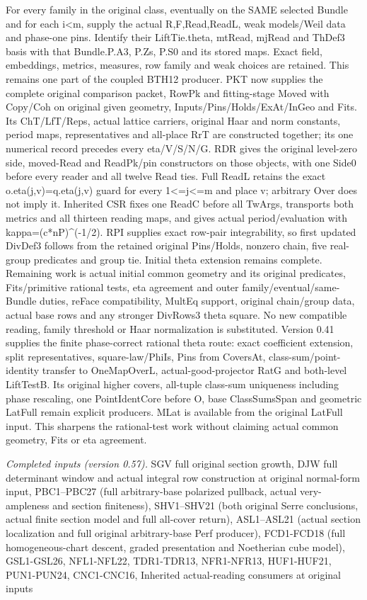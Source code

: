 \documentclass[11pt,a4paper]{article}
\numberwithin{equation}{section}
\theoremstyle{remark}\newtheorem{remark}[theorem]{Remark}
\begin{document}
For every family in the original class, eventually on the SAME selected Bundle and for each i<m, supply the actual R,F,Read,ReadL, weak models/Weil data and phase-one pins. Identify their LiftTie.theta, mtRead, mjRead and ThDef3 basis with that Bundle.P.A3, P.Zs, P.S0 and its stored maps. Exact field, embeddings, metrics, measures, row family and weak choices are retained. This remains one part of the coupled BTH12 producer. PKT now supplies the complete original comparison packet, RowPk and fitting-stage Moved with Copy/Coh on original given geometry, Inputs/Pins/Holds/ExAt/InGeo and Fits. Its ChT/LfT/Reps, actual lattice carriers, original Haar and norm constants, period maps, representatives and all-place RrT are constructed together; its one numerical record precedes every eta/V/S/N/G. RDR gives the original level-zero side, moved-Read and ReadPk/pin constructors on those objects, with one Side0 before every reader and all twelve Read ties. Full ReadL retains the exact o.eta(j,v)=q.eta(j,v) guard for every 1<=j<=m and place v; arbitrary Over does not imply it. Inherited CSR fixes one ReadC before all TwArgs, transports both metrics and all thirteen reading maps, and gives actual period/evaluation with kappa=(c*nP)\textasciicircum{}(-1/2). RPI supplies exact row-pair integrability, so first updated DivDef3 follows from the retained original Pins/Holds, nonzero chain, five real-group predicates and group tie. Initial theta extension remains complete. Remaining work is actual initial common geometry and its original predicates, Fits/primitive rational tests, eta agreement and outer family/eventual/same-Bundle duties, reFace compatibility, MultEq support, original chain/group data, actual base rows and any stronger DivRows3 theta square. No new compatible reading, family threshold or Haar normalization is substituted. Version 0.41 supplies the finite phase-correct rational theta route: exact coefficient extension, split representatives, square-law/PhiIs, Pins from CoversAt, class-sum/point-identity transfer to OneMapOverL, actual-good-projector RatG and both-level LiftTestB. Its original higher covers, all-tuple class-sum uniqueness including phase rescaling, one PointIdentCore before O, base ClassSumsSpan and geometric LatFull remain explicit producers. MLat is available from the original LatFull input. This sharpens the rational-test work without claiming actual common geometry, Fits or eta agreement.

\emph{Completed inputs (version 0.57).} SGV full original section growth, DJW full determinant window and actual integral row construction at original normal-form input, PBC1–PBC27 (full arbitrary-base polarized pullback, actual very-ampleness and section finiteness), SHV1–SHV21 (both original Serre conclusions, actual finite section model and full all-cover return), ASL1–ASL21 (actual section localization and full original arbitrary-base Perf producer), FCD1-FCD18 (full homogeneous-chart descent, graded presentation and Noetherian cube model), GSL1-GSL26, NFL1-NFL22, TDR1-TDR13, NFR1-NFR13, HUF1-HUF21, PUN1-PUN24, CNC1-CNC16, Inherited actual-reading consumers at original inputs
\end{document}
